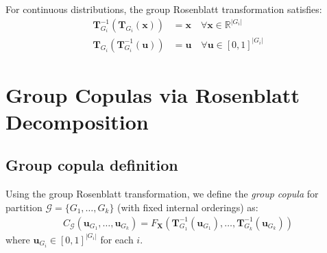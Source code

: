 \begin{theorem}
\label{thm:perfect_inverse}
For continuous distributions, the group Rosenblatt transformation satisfies:
\begin{align}
\mathbf{T}_{G_i}^{-1}(\mathbf{T}_{G_i}(\mathbf{x})) &= \mathbf{x} \quad \forall \mathbf{x} \in \mathbb{R}^{|G_i|} \\
\mathbf{T}_{G_i}(\mathbf{T}_{G_i}^{-1}(\mathbf{u})) &= \mathbf{u} \quad \forall \mathbf{u} \in [0,1]^{|G_i|}
\end{align}
\end{theorem}

\section{Group Copulas via Rosenblatt Decomposition}
\subsection{Group copula definition}
\begin{definition}
\label{def:group_copula}
Using the group Rosenblatt transformation, we define the \emph{group copula} for partition $\mathcal{G} = \{G_1, \ldots, G_k\}$ (with fixed internal orderings) as:
\begin{align}
C_{\mathcal{G}}(\mathbf{u}_{G_1}, \ldots, \mathbf{u}_{G_k}) = F_{\mathbf{X}}(\mathbf{T}_{G_1}^{-1}(\mathbf{u}_{G_1}), \ldots, \mathbf{T}_{G_k}^{-1}(\mathbf{u}_{G_k}))
\end{align}
where $\mathbf{u}_{G_i} \in [0,1]^{|G_i|}$ for each $i$.
\end{definition}

